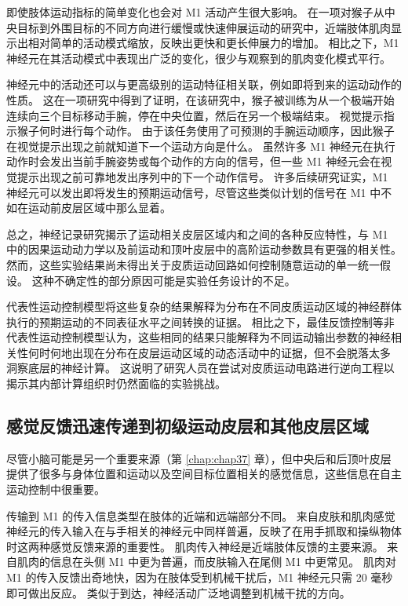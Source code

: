 即使肢体运动指标的简单变化也会对 M1 活动产生很大影响。 在一项对猴子从中央目标到外围目标的不同方向进行缓慢或快速伸展运动的研究中，近端肢体肌肉显示出相对简单的活动模式缩放，反映出更快和更长伸展力的增加。 相比之下，M1 神经元在其活动模式中表现出广泛的变化，很少与观察到的肌肉变化模式平行。

神经元中的活动还可以与更高级别的运动特征相关联，例如即将到来的运动动作的性质。 这在一项研究中得到了证明，在该研究中，猴子被训练为从一个极端开始连续向三个目标移动手腕，停在中央位置，然后在另一个极端结束。 视觉提示指示猴子何时进行每个动作。 由于该任务使用了可预测的手腕运动顺序，因此猴子在视觉提示出现之前就知道下一个运动方向是什么。 虽然许多 M1 神经元在执行动作时会发出当前手腕姿势或每个动作的方向的信号，但一些 M1 神经元会在视觉提示出现之前可靠地发出序列中的下一个动作信号。 许多后续研究证实，M1 神经元可以发出即将发生的预期运动信号，尽管这些类似计划的信号在 M1 中不如在运动前皮层区域中那么显着。

总之，神经记录研究揭示了运动相关皮层区域内和之间的各种反应特性，与 M1 中的因果运动动力学以及前运动和顶叶皮层中的高阶运动参数具有更强的相关性。 然而，这些实验结果尚未得出关于皮质运动回路如何控制随意运动的单一统一假设。 这种不确定性的部分原因可能是实验任务设计的不足。

代表性运动控制模型将这些复杂的结果解释为分布在不同皮质运动区域的神经群体执行的预期运动的不同表征水平之间转换的证据。 相比之下，最佳反馈控制等非代表性运动控制模型认为，这些相同的结果只能解释为不同运动输出参数的神经相关性何时何地出现在分布在皮层运动区域的动态活动中的证据，但不会脱落太多 洞察底层的神经计算。 这说明了研究人员在尝试对皮质运动电路进行逆向工程以揭示其内部计算组织时仍然面临的实验挑战。

\subsection{感觉反馈迅速传递到初级运动皮层和其他皮层区域}
尽管小脑可能是另一个重要来源（第 \ref{chap:chap37} 章），但中央后和后顶叶皮层提供了很多与身体位置和运动以及空间目标位置相关的感觉信息，这些信息在自主运动控制中很重要。

传输到 M1 的传入信息类型在肢体的近端和远端部分不同。 来自皮肤和肌肉感觉神经元的传入输入在与手相关的神经元中同样普遍，反映了在用手抓取和操纵物体时这两种感觉反馈来源的重要性。 肌肉传入神经是近端肢体反馈的主要来源。 来自肌肉的信息在头侧 M1 中更为普遍，而皮肤输入在尾侧 M1 中更常见。 肌肉对 M1 的传入反馈出奇地快，因为在肢体受到机械干扰后，M1 神经元只需 20 毫秒即可做出反应。 类似于到达，神经活动广泛地调整到机械干扰的方向。

